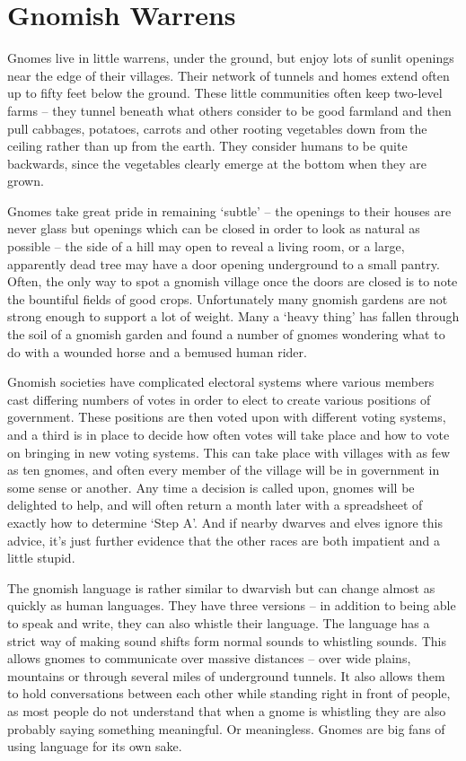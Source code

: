 \section[Gnomes]{Gnomish Warrens \Gn}

\begin{multicols}{2}

\noindent
Gnomes live in little warrens, under the ground, but enjoy lots of sunlit openings near the edge of their villages.
Their network of tunnels and homes extend often up to fifty feet below the ground.
These little communities often keep two-level farms -- they tunnel beneath what others consider to be good farmland and then pull cabbages, potatoes, carrots and other rooting vegetables down from the ceiling rather than up from the earth.
They consider humans to be quite backwards, since the vegetables clearly emerge at the bottom when they are grown.

Gnomes take great pride in remaining `subtle' -- the openings to their houses are never glass but openings which can be closed in order to look as natural as possible -- the side of a hill may open to reveal a living room, or a large, apparently dead tree may have a door opening underground to a small pantry. Often, the only way to spot a gnomish village once the doors are closed is to note the bountiful fields of good crops. Unfortunately many gnomish gardens are not strong enough to support a lot of weight. Many a `heavy thing' has fallen through the soil of a gnomish garden and found a number of gnomes wondering what to do with a wounded horse and a bemused human rider.

Gnomish societies have complicated electoral systems where various members cast differing numbers of votes in order to elect to create various positions of government. These positions are then voted upon with different voting systems, and a third is in place to decide how often votes will take place and how to vote on bringing in new voting systems. This can take place with villages with as few as ten gnomes, and often every member of the village will be in government in some sense or another. Any time a decision is called upon, gnomes will be delighted to help, and will often return a month later with a spreadsheet of exactly how to determine `Step A'. And if nearby dwarves and elves ignore this advice, it's just further evidence that the other races are both impatient and a little stupid.

The gnomish language is rather similar to dwarvish but can change almost as quickly as human languages. They have three versions -- in addition to being able to speak and write, they can also whistle their language. The language has a strict way of making sound shifts form normal sounds to whistling sounds. This allows gnomes to communicate over massive distances -- over wide plains, mountains or through several miles of underground tunnels. It also allows them to hold conversations between each other while standing right in front of people, as most people do not understand that when a gnome is whistling they are also probably saying something meaningful. Or meaningless. Gnomes are big fans of using language for its own sake. 


\end{multicols}
